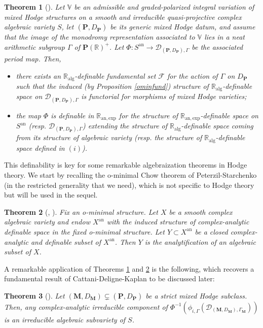 \documentclass[10pt]{article}
\numberwithin{equation}{subsection}
\theoremstyle{plain}
\newtheorem{theorem}{Theorem}[section]
\theoremstyle{definition}
\theoremstyle{remark}
\newcommand{\alg}{\mathbb{R}_\mathrm{alg}}
\newcommand{\anexp}{\mathbb{R}_\mathrm{an,exp}}
\newcommand{\R}{\mathbb R}
\newcommand{\V}{\mathbb V}
\newcommand{\pp}{\mathbf P}
\newcommand{\M}{\mathbf M}
\newcommand{\an}{\mathrm{an}}
\newcommand{\period}{\mathscr{D}}
\begin{document}
\begin{theorem}[{\cite[Thm. 4.4]{bbkt}}]\label{defpermap}
Let $\V$ be an admissible and graded-polarized integral variation of mixed Hodge structures on a smooth and irreducible quasi-projective complex algebraic variety $S$, let $(\pp, D_\pp)$ be its generic mixed Hodge datum, and assume that the image of the monodromy representation associated to $\V$ lies in a neat arithmetic subgroup $\Gamma$ of $\pp(\R)^+$. Let $\Phi : S^\an \rightarrow \period_{(\pp, D_\pp), \Gamma}$  be the associated period map. Then,
\begin{itemize}
\item[(i)] there exists an $\alg$-definable fundamental set $\mathscr{F}$ for the action of $\Gamma$ on $D_\pp$ such that the induced (by Proposition \ref{ominfund}) structure of $\alg$-definable space on $\period_{(\pp, D_\pp), \Gamma}$ is functorial for morphisms of mixed Hodge varieties;
\item[(ii)] the map $\Phi$ is definable in $\anexp$ for the structure of $\anexp$-definable space on $S^\an$ (resp. $\period_{(\pp, D_\pp), \Gamma}$) extending the structure of $\alg$-definable space coming from its structure of algebraic variety (resp. the structure of $\alg$-definable space defined in $(i)$).
\end{itemize}
\end{theorem}
This definability is key for some remarkable algebraization theorems in Hodge theory. We start by recalling the o-minimal Chow theorem of Peterzil-Starchenko (in the restricted generality that we need), which is not specific to Hodge theory but will be used in the sequel.
\begin{theorem}[{\cite[Cor. 4.5]{PS}, \cite[Thm. 3.3]{bbt}}]\label{petstar}
Fix an o-minimal structure. Let $X$ be a smooth complex algebraic variety and endow $X^\an$ with the induced structure of complex-analytic definable space in the fixed o-minimal structure. Let $Y \subset X^\an$ be a closed complex-analytic and definable subset of $X^\an$. Then $Y$ is the analytification of an algebraic subset of $X$. 
\end{theorem}
A remarkable application of Theorems \ref{defpermap} and \ref{petstar} is the following, which recovers a fundamental result of Cattani-Deligne-Kaplan to be discussed later:
\begin{theorem}[{\cite[Cor. 6.7]{bbkt}}] \label{algspec}
Let $(\M,D_\M) \subsetneq (\pp, D_\pp)$ be a strict mixed Hodge subclass. Then, any complex-analytic irreducible component of $\Phi^{-1}(\phi_{i, \Gamma}(\period_{(\M,D_\M), \Gamma_\M}))$ is an irreducible algebraic subvariety of $S$.
\end{theorem}
\end{document}
